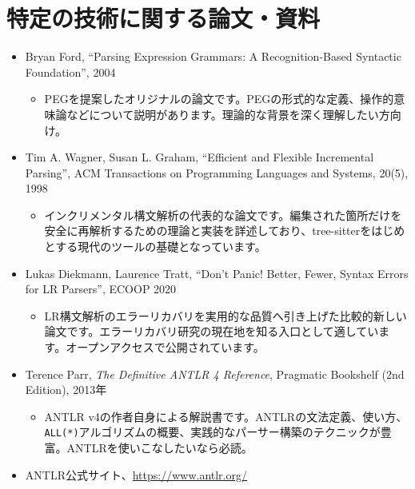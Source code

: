 \section*{特定の技術に関する論文・資料}\label{a.2}

\begin{itemize}
\item
  Bryan Ford, ``Parsing Expression Grammars: A Recognition-Based
  Syntactic Foundation'', 2004

  \begin{itemize}
  \item
    PEGを提案したオリジナルの論文です。PEGの形式的な定義、操作的意味論などについて説明があります。理論的な背景を深く理解したい方向け。
  \end{itemize}
\item
  Tim A. Wagner, Susan L. Graham, ``Efficient and Flexible Incremental
  Parsing'', ACM Transactions on Programming Languages and Systems,
  20(5), 1998

  \begin{itemize}
  \item
    インクリメンタル構文解析の代表的な論文です。編集された箇所だけを安全に再解析するための理論と実装を詳述しており、tree-sitterをはじめとする現代のツールの基礎となっています。
  \end{itemize}
\item
  Lukas Diekmann, Laurence Tratt, ``Don't Panic! Better, Fewer, Syntax
  Errors for LR Parsers'', ECOOP 2020

  \begin{itemize}
  \item
    LR構文解析のエラーリカバリを実用的な品質へ引き上げた比較的新しい論文です。エラーリカバリ研究の現在地を知る入口として適しています。オープンアクセスで公開されています。
  \end{itemize}
\item
  Terence Parr, \emph{The Definitive ANTLR 4 Reference}, Pragmatic
  Bookshelf (2nd Edition), 2013年

  \begin{itemize}
  \item
    ANTLR v4の作者自身による解説書です。ANTLRの文法定義、使い方、\texttt{ALL(*)}アルゴリズムの概要、実践的なパーサー構築のテクニックが豊富。ANTLRを使いこなしたいなら必読。
  \end{itemize}
\item
  ANTLR公式サイト、\url{https://www.antlr.org/}


\end{itemize}
